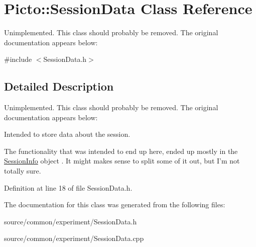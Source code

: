 \hypertarget{class_picto_1_1_session_data}{\section{Picto\-:\-:Session\-Data Class Reference}
\label{class_picto_1_1_session_data}
}


Unimplemented. This class should probably be removed. The original documentation appears below\-:  




{\ttfamily \#include $<$Session\-Data.\-h$>$}



\subsection{Detailed Description}
Unimplemented. This class should probably be removed. The original documentation appears below\-: 

Intended to store data about the session.

The functionality that was intended to end up here, ended up mostly in the \hyperlink{class_session_info}{Session\-Info} object . It might makes sense to split some of it out, but I'm not totally sure. 

Definition at line 18 of file Session\-Data.\-h.



The documentation for this class was generated from the following files\-:\begin{DoxyCompactItemize}
\item 
source/common/experiment/Session\-Data.\-h\item 
source/common/experiment/Session\-Data.\-cpp\end{DoxyCompactItemize}

